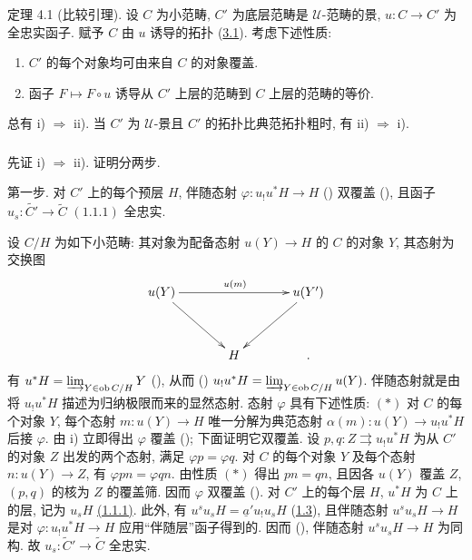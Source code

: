 \begin{enonce*}{定理 4.1}
{\rm(比较引理)}. 设 $C$ 为小范畴, $C'$ 为底层范畴是 $𝒰$-范畴的景,
$u:C\rightarrow C'$ 为全忠实函子.
赋予 $C$ 由 $u$ 诱导的拓扑 {\rm(\hyperref[III.subsec3.1]{3.1}).}
考虑下述性质:
\begin{enumerate}
\renewcommand{\theenumi}{\roman{enumi}}
\renewcommand{\labelenumi}{\theenumi)}
\item $C'$ 的每个对象均可由来自 $C$ 的对象覆盖.

\item 函子 $F\mapsto F\circ u$ 诱导从 $C'$ 上层的范畴到 $C$ 上层的范畴的等价.
\end{enumerate}

总有 {\rm i) $\Rightarrow$ ii).}
当 $C'$ 为 $𝒰$-景且 $C'$ 的拓扑比典范拓扑粗时, 有 {\rm ii) $\Rightarrow$ i).}
\end{enonce*}

\setcounter{subsection}{1}
\subsubsection{}
先证 i) $\Rightarrow$ ii). 证明分两步.

第一步. 对 $C'$ 上的每个预层 $H$, 伴随态射
$\varphi:u_{!}u^{\ast}H\rightarrow H$ {\rm()}
双覆盖 {\rm()},
且函子 $u_s:\widetilde{C'}\rightarrow \widetilde{C}$
$\hyperref[III.subsec1.11]{(1.1.1)}$ 全忠实.

设 $C/H$ 为如下小范畴: 其对象为配备态射 $u(Y)\rightarrow H$ 的 $C$ 的对象 $Y$,
其态射为交换图
\[
\xymatrix@=1.25cm{
u(Y) \ar[rr]^{u(m)} \ar[rd]&     &u(Y')\ar[ld]\\
     &  H  & .
}
\]
有 $u^{\ast}H=\varinjlim_{Y\in \operatorname{ob} C/H} Y$ (),
从而 ()
$u_{!}u^{\ast}H=\varinjlim_{Y\in \operatorname{ob} C/H} u(Y)$.
伴随态射就是由将 $u_{!}u^{\ast}H$ 描述为归纳极限而来的显然态射.
态射 $\varphi$ 具有下述性质:\pageoriginale{} $(\ast)$
对 $C$ 的每个对象 $Y$, 每个态射 $m:u(Y)\rightarrow H$
唯一分解为典范态射 $\alpha(m):u(Y)\rightarrow u_{!}u^{\ast}H$ 后接 $\varphi$.
由 i) 立即得出 $\varphi$ 覆盖 (); 下面证明它双覆盖.
设 $p,q:Z\rightrightarrows u_{!}u^{\ast}H$ 为从 $C'$ 的对象 $Z$ 出发的两个态射,
满足 $\varphi p=\varphi q$.
对 $C$ 的每个对象 $Y$ 及每个态射 $n:u(Y)\rightarrow Z$, 有 $\varphi pn=\varphi qn$.
由性质 $(\ast)$ 得出 $pn=qn$, 且因各 $u(Y)$ 覆盖 $Z$,
$(p,q)$ 的核为 $Z$ 的覆盖筛. 因而 $\varphi$ 双覆盖 ().
对 $C'$ 上的每个层 $H$, $u^{\ast}H$ 为 $C$ 上的层,
记为 $u_sH$ \hyperref[III.subsec1.11]{(1.1.1)}.
此外, 有 $u^su_sH=\underline{a}'u_{!}u_sH$ (\hyperref[III.prop1.3]{1.3}),
且伴随态射 $u^su_sH\rightarrow H$ 是对
$\varphi:u_{!}u^{\ast}H\rightarrow H$ 应用“伴随层”函子得到的.
因而 (), 伴随态射 $u^su_sH\rightarrow H$ 为同构.
故 $u_s:\widetilde{C}'\rightarrow \widetilde{C}$ 全忠实.

